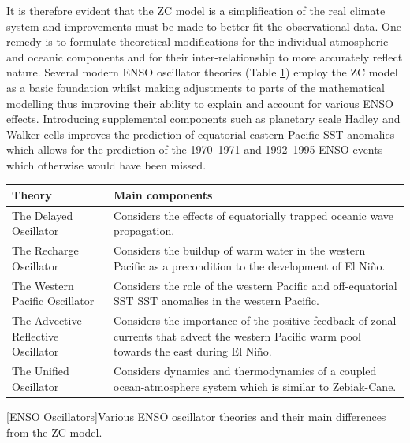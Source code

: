 \documentclass[12pt, onecolumn]{revtex4}    %
\begin{document}
It is therefore evident that the ZC model is a simplification of the real climate system and improvements must be made to better fit the observational data. One remedy is to formulate theoretical modifications for the individual atmospheric and oceanic components and for their inter-relationship to more accurately reflect nature. Several modern ENSO oscillator theories (Table \ref{table:enso_oscillators}) employ the ZC model as a basic foundation whilst making adjustments to parts of the mathematical modelling thus improving their ability to explain and account for various ENSO effects. Introducing supplemental components such as planetary scale Hadley and Walker cells \citep{qian1997multiple} improves the prediction of equatorial eastern Pacific SST anomalies which allows for the prediction of the 1970--1971 and 1992--1995 ENSO events which otherwise would have been missed. \\

\begin{table}[htbp]
\renewcommand{\arraystretch}{1.0}
\begin{tabular}{|p{7cm}|p{9cm}|}
 \hline
 \textbf{Theory} & \textbf{Main components} \\ [0.5ex] 
 \hline
 The Delayed Oscillator \citep{Suarez:1988aa, Battisti:1988aa} & Considers the effects of equatorially trapped oceanic wave propagation. \\
 \hline
 The Recharge Oscillator \citep{Jin:1997aa} & Considers the buildup of warm water in the western Pacific as a precondition to the development of El Ni\~{n}o. \\
 \hline
 The Western Pacific Oscillator \citep{Weisberg:1997aa, wang1999effects} & Considers the role of the western Pacific and off-equatorial SST SST anomalies in the western Pacific. \\
 \hline
 The Advective-Reflective Oscillator \citep{Picaut663} & Considers the importance of the positive feedback of zonal currents that advect the western Pacific warm pool towards the east during El Ni\~{n}o.  \\
 \hline
 The Unified Oscillator \citep{wang2001unified} & Considers dynamics and thermodynamics of a coupled ocean-atmosphere system which is similar to Zebiak-Cane. \\
 \hline
\end{tabular}
[ENSO Oscillators]{Various ENSO oscillator theories and their main differences from the ZC model.}
\label{table:enso_oscillators}
\end{table}
\end{document}
